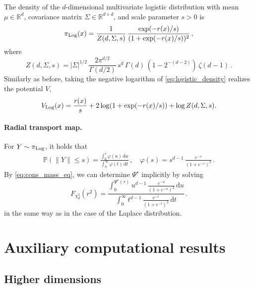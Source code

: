 \documentclass[twoside]{article}
\newcommand{\1}{\mathds{1}}
\renewcommand{\phi}{\varphi}
\newcommand*{\rd}{\mathrm{d}}
\newcommand*{\dd}{\, \rd}
\theoremstyle{plain}
\theoremstyle{definition}
\theoremstyle{remark}
\begin{document}
The density of the $d$-dimensional multivariate logistic distribution with mean 
$\mu \in \mathbb{R}^d$, covariance matrix $\Sigma \in \mathbb{R}^{d \times d}$, 
and scale parameter $s > 0$ is
\begin{equation}\label{eq:logistic_density}
\pi_{\rm Log}(x) = \frac{1}{Z(d,\Sigma,s)}\,
\frac{\exp(-r(x)/s)}{(1+\exp(-r(x)/s))^{2}}\,,
\end{equation}
where
\[
Z(d,\Sigma,s) =
|\Sigma|^{1/2}\,
\frac{2 \pi^{d/2}}{\Gamma(d/2)}\,
s^{d}\,
\Gamma(d)\,
(1-2^{{-(d-2)}})\,
\zeta({d-1})\,.
\]
Similarly as before, taking the negative logarithm of \eqref{eq:logistic_density} realizes the potential $V$,
\begin{equation}
V_{\rm Log}(x) =
\frac{r(x)}{s}
+ 2\log(1+\exp(-r(x)/s))
+ \log Z(d,\Sigma,s).
\label{eq:logistic_potential}
\end{equation}

\paragraph{Radial transport map.} For $Y \sim \pi_{\rm Log}$, it holds that
\begin{align*}
    \mathbb{P}(\|Y\|\le s)
=\frac{\displaystyle\int_0^{s}\phi(u)\dd u}
       {\displaystyle\int_0^{\infty}\phi(t) \dd t}\,, \quad \phi(s)=s^{d-1}\,\frac{e^{-s}}{(1+e^{-s})^2}\,.
\end{align*}
By \eqref{eq:cons_mass_eq}, we can determine $\Psi^\star$ implicitly by solving
\[
F_{\chi^2_d}(r^2)
=\frac{\displaystyle\int_0^{\Psi^\star(r)} u^{d-1}\,\frac{e^{-u}}{(1+e^{-u})^2} \dd u}
       {\displaystyle\int_0^{\infty} t^{d-1}\,\frac{e^{-t}}{(1+e^{-t})^2} \dd t}\,.
\]
in the same way as in the case of the Laplace distribution.

\section{Auxiliary computational results}\label{sec:aux_figures}


\subsection{Higher dimensions}\label{sec:high_dim_examples}
\end{document}
